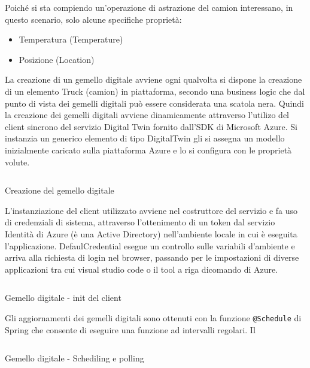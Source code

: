 \documentclass[a4paper,11pt]{article}
\newenvironment{longlisting}{\captionsetup{type=figure,labelformat=custom}}{}
\begin{document}
Poiché si sta compiendo un'operazione di astrazione del camion interessano, in questo scenario, solo alcune specifiche proprietà:

\begin{itemize}
  \item Temperatura (Temperature)
  \item Posizione (Location)
\end{itemize}

La creazione di un gemello digitale avviene ogni qualvolta si dispone la creazione di un elemento Truck (camion) in piattaforma, secondo una business logic che dal punto di vista dei gemelli digitali può essere considerata una scatola nera. Quindi la creazione dei gemelli digitali avviene dinamicamente attraverso l'utilizo del client sincrono del servizio Digital Twin fornito dall'SDK di Microsoft Azure. Si instanzia un generico elemento di tipo DigitalTwin gli si assegna un modello inizialmente caricato sulla piattaforma Azure e lo si configura con le proprietà volute.

\begin{longlisting}
  \inputminted{java}{./code/dt.create.java}
  \caption{Creazione del gemello digitale}
  \label{listing:dt2}
\end{longlisting}

L'instanziazione del client utilizzato avviene nel costruttore del servizio e fa uso di credenziali di sistema, attraverso l'ottenimento di un token dal servizio Identità di Azure (è una Active Directory) nell'ambiente locale in cui è eseguita l'applicazione. DefaulCredential esegue un controllo sulle variabili d'ambiente e arriva alla richiesta di login nel browser, passando per le impostazioni di diverse applicazioni tra cui visual studio code o il tool a riga dicomando di Azure.

\begin{longlisting}
  \inputminted{java}{./code/dt.init.java}
  \caption{Gemello digitale - init del client}
  \label{listing:dt3}
\end{longlisting}

Gli aggiornamenti dei gemelli digitali sono ottenuti con la funzione \texttt{@Schedule} di Spring che consente di eseguire una funzione ad intervalli regolari. Il

\begin{longlisting}
  \inputminted{java}{./code/dt.polling.java}
  \caption{Gemello digitale - Schediling e polling}
  \label{listing:dt4}
\end{longlisting}
\end{document}

